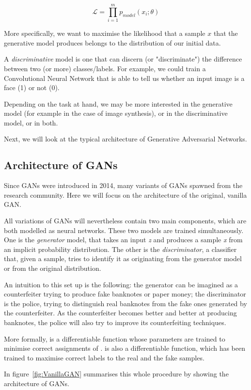 \[\mathscr{L} = \prod_{i=1}^{m} p_{model}(x_i;\theta)\]

More specifically, we want to maximise the likelihood that a sample $x$ that the generative model produces belongs to the distribution of our initial data.

A \textit{discriminative} model is one that can discern (or "discriminate") the difference between two (or more) classes/labels. For example, we could train a Convolutional Neural Network that is able to tell us whether an input image is a face (1) or not (0).

Depending on the task at hand, we may be more interested in the generative model (for example in the case of image synthesis), or in the discriminative model, or in both.

Next, we will look at the typical architecture of Generative Adversarial Networks.

\subsection{Architecture of GANs}
Since GANs were introduced in 2014, many variants of GANs spawned from the research community. Here we will focus on the architecture of the original, vanilla GAN.

All variations of GANs will nevertheless contain two main components, which are both modelled as neural networks. These two models are trained simultaneously. One is the \emph{generator} model, that takes an input \emph{z} and produces a sample \emph{x} from an implicit probability distribution. The other is the \emph{discriminator}, a classifier that, given a sample, tries to identify it as originating from the generator model or from the original distribution.

An intuition to this set up is the following: the generator  can be imagined as a counterfeiter trying to produce fake banknotes or paper money; the discriminator  is the police, trying to distinguish real banknotes from the fake ones generated by the counterfeiter. As the counterfeiter becomes better and better at producing banknotes, the police will also try to improve its counterfeiting techniques.

More formally,  is a differentiable function whose parameters are trained to minimise correct assignments of .  is also a differentiable function, which has been trained to maximise correct labels to the real and the fake samples.

In figure~\ref{fig:VanillaGAN} summarises this whole procedure by showing the architecture of GANs.

